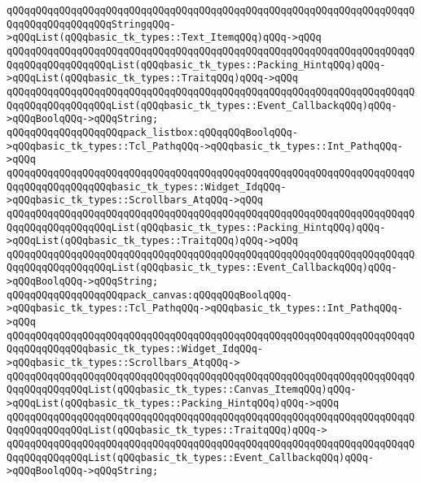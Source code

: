 \verb|qQQqqQQqqQQqqQQqqQQqqQQqqQQqqQQqqQQqqQQqqQQqqQQqqQQqqQQqqQQqqQQqqQQqqQQqqQQqqQQqqQQqqQQqStringqQQq->qQQqList(qQQqbasic_tk_types::Text_ItemqQQq)qQQq->qQQq|\newline
\verb|qQQqqQQqqQQqqQQqqQQqqQQqqQQqqQQqqQQqqQQqqQQqqQQqqQQqqQQqqQQqqQQqqQQqqQQqqQQqqQQqqQQqqQQqList(qQQqbasic_tk_types::Packing_HintqQQq)qQQq->qQQqList(qQQqbasic_tk_types::TraitqQQq)qQQq->qQQq|\newline
\verb|qQQqqQQqqQQqqQQqqQQqqQQqqQQqqQQqqQQqqQQqqQQqqQQqqQQqqQQqqQQqqQQqqQQqqQQqqQQqqQQqqQQqqQQqList(qQQqbasic_tk_types::Event_CallbackqQQq)qQQq->qQQqBoolqQQq->qQQqString;|\newline
\newline
\verb|qQQqqQQqqQQqqQQqqQQqpack_listbox:qQQqqQQqBoolqQQq->qQQqbasic_tk_types::Tcl_PathqQQq->qQQqbasic_tk_types::Int_PathqQQq->qQQq|\newline
\verb|qQQqqQQqqQQqqQQqqQQqqQQqqQQqqQQqqQQqqQQqqQQqqQQqqQQqqQQqqQQqqQQqqQQqqQQqqQQqqQQqqQQqqQQqbasic_tk_types::Widget_IdqQQq->qQQqbasic_tk_types::Scrollbars_AtqQQq->qQQq|\newline
\verb|qQQqqQQqqQQqqQQqqQQqqQQqqQQqqQQqqQQqqQQqqQQqqQQqqQQqqQQqqQQqqQQqqQQqqQQqqQQqqQQqqQQqqQQqList(qQQqbasic_tk_types::Packing_HintqQQq)qQQq->qQQqList(qQQqbasic_tk_types::TraitqQQq)qQQq->qQQq|\newline
\verb|qQQqqQQqqQQqqQQqqQQqqQQqqQQqqQQqqQQqqQQqqQQqqQQqqQQqqQQqqQQqqQQqqQQqqQQqqQQqqQQqqQQqqQQqList(qQQqbasic_tk_types::Event_CallbackqQQq)qQQq->qQQqBoolqQQq->qQQqString;|\newline
\newline
\verb|qQQqqQQqqQQqqQQqqQQqpack_canvas:qQQqqQQqBoolqQQq->qQQqbasic_tk_types::Tcl_PathqQQq->qQQqbasic_tk_types::Int_PathqQQq->qQQq|\newline
\verb|qQQqqQQqqQQqqQQqqQQqqQQqqQQqqQQqqQQqqQQqqQQqqQQqqQQqqQQqqQQqqQQqqQQqqQQqqQQqqQQqqQQqbasic_tk_types::Widget_IdqQQq->qQQqbasic_tk_types::Scrollbars_AtqQQq->|\newline
\verb|qQQqqQQqqQQqqQQqqQQqqQQqqQQqqQQqqQQqqQQqqQQqqQQqqQQqqQQqqQQqqQQqqQQqqQQqqQQqqQQqqQQqList(qQQqbasic_tk_types::Canvas_ItemqQQq)qQQq->qQQqList(qQQqbasic_tk_types::Packing_HintqQQq)qQQq->qQQq|\newline
\verb|qQQqqQQqqQQqqQQqqQQqqQQqqQQqqQQqqQQqqQQqqQQqqQQqqQQqqQQqqQQqqQQqqQQqqQQqqQQqqQQqqQQqList(qQQqbasic_tk_types::TraitqQQq)qQQq->|\newline
\verb|qQQqqQQqqQQqqQQqqQQqqQQqqQQqqQQqqQQqqQQqqQQqqQQqqQQqqQQqqQQqqQQqqQQqqQQqqQQqqQQqqQQqList(qQQqbasic_tk_types::Event_CallbackqQQq)qQQq->qQQqBoolqQQq->qQQqString;|\newline
